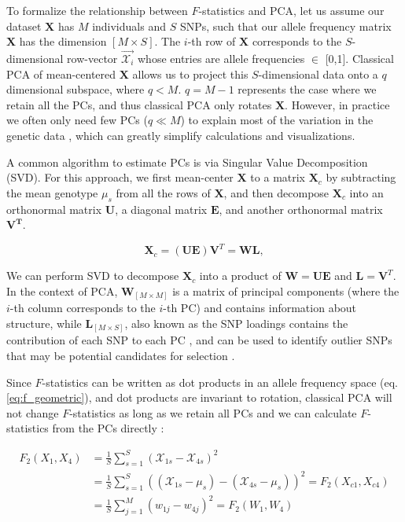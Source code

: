 \documentclass[12pt]{article}
\newcommand{\MX}{\mathbf{X}}
\begin{document}
To formalize the relationship between $F$-statistics and PCA, let us assume our dataset $\mathbf{X}$ has $M$ individuals and $S$ SNPs, such that our allele frequency matrix $\MX$ has the dimension $[M \times S]$. The $i$-th row of $\MX$ corresponds to the $S$-dimensional row-vector $\Vec{\mathcal{X}_i}$ whose entries are  allele frequencies $\in$ [0,1]. Classical PCA of mean-centered $\MX$ allows us to project this $S$-dimensional data onto a $q$ dimensional subspace, where $q < M$. $q = M-1$ represents the case where we retain all the PCs, and thus classical PCA only rotates $\MX$. However, in practice we often only need few PCs ($q \ll M$) to explain most of the variation in the genetic data \citep{peter_geometric_2022}, which can greatly simplify calculations and visualizations. 

A common algorithm to estimate PCs is via Singular Value Decomposition (SVD). For this approach, we first mean-center $\MX$ to a  matrix $\MX_c$ by subtracting the mean genotype $\mu_s$ from all the rows of $\MX$, and then decompose $\MX_c$ into an orthonormal matrix $\mathbf{U}$, a diagonal matrix $\mathbf{E}$, and another orthonormal matrix $\mathbf{V^T}$.

$$\MX_c = (\mathbf{U}\mathbf{E}) \mathbf{V}^T = \mathbf{WL},$$

We can perform SVD to decompose $\MX_c$ into a product of $\mathbf{W} = \mathbf{UE}$ and $\mathbf{L} = \mathbf{V}^T$. In the context of PCA, $\mathbf{W}_{[M\times M]}$ is a matrix of principal components (where the $i$-th column corresponds to the $i$-th PC) and contains information about structure, while $\mathbf{L}_{[M\times S]}$, also known as the SNP loadings contains the contribution of each SNP to each PC \citep{gower_distance_1966}, and can be used to identify outlier SNPs that may be potential candidates for selection \citep{meisner_detecting_2021}. 

Since $F$-statistics can be written as dot products in an allele frequency space (eq. \ref{eq:f_geometric}), and dot products are invariant to rotation, classical PCA will not change $F$-statistics as long as we retain all PCs and we can calculate $F$-statistics from the PCs directly \citep{peter_geometric_2022}:

\begin{align}\label{eq:f_pca}
F_2(X_1,X_4) &= \frac{1}{S}\sum_{s=1}^S(\mathcal{X}_{1s} - \mathcal{X}_{4s})^2\nonumber\\
&= \frac{1}{S}\sum_{s=1}^S\left((\mathcal{X}_{1s} - \mu_s)- (\mathcal{X}_{4s} - \mu_s)\right)^2 = F_2(X_{c1},X_{c4})\nonumber\\
&=\frac{1}{S} \sum_{j=1}^{M}(w_{1j} - w_{4j})^2 = F_2(W_1,W_4)\nonumber\\
\end{align}
\end{document}
